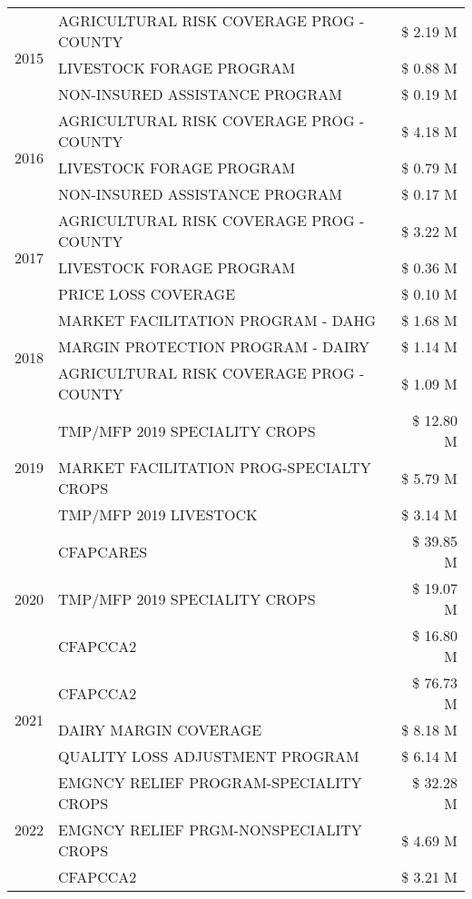 \begin{tabular}{llr}
\cline{1-3}
\multirow[t]{3}{*}{2015} & AGRICULTURAL RISK COVERAGE PROG - COUNTY & \$ 2.19 M \\
 & LIVESTOCK FORAGE PROGRAM & \$ 0.88 M \\
 & NON-INSURED ASSISTANCE PROGRAM & \$ 0.19 M \\
\cline{1-3}
\multirow[t]{3}{*}{2016} & AGRICULTURAL RISK COVERAGE PROG - COUNTY & \$ 4.18 M \\
 & LIVESTOCK FORAGE PROGRAM & \$ 0.79 M \\
 & NON-INSURED ASSISTANCE PROGRAM & \$ 0.17 M \\
\cline{1-3}
\multirow[t]{3}{*}{2017} & AGRICULTURAL RISK COVERAGE PROG - COUNTY & \$ 3.22 M \\
 & LIVESTOCK FORAGE PROGRAM & \$ 0.36 M \\
 & PRICE LOSS COVERAGE & \$ 0.10 M \\
\cline{1-3}
\multirow[t]{3}{*}{2018} & MARKET FACILITATION PROGRAM - DAHG & \$ 1.68 M \\
 & MARGIN PROTECTION PROGRAM - DAIRY & \$ 1.14 M \\
 & AGRICULTURAL RISK COVERAGE PROG - COUNTY & \$ 1.09 M \\
\cline{1-3}
\multirow[t]{3}{*}{2019} & TMP/MFP 2019 SPECIALITY CROPS & \$ 12.80 M \\
 & MARKET FACILITATION PROG-SPECIALTY CROPS & \$ 5.79 M \\
 & TMP/MFP 2019 LIVESTOCK & \$ 3.14 M \\
\cline{1-3}
\multirow[t]{3}{*}{2020} & CFAPCARES & \$ 39.85 M \\
 & TMP/MFP 2019 SPECIALITY CROPS & \$ 19.07 M \\
 & CFAPCCA2 & \$ 16.80 M \\
\cline{1-3}
\multirow[t]{3}{*}{2021} & CFAPCCA2 & \$ 76.73 M \\
 & DAIRY MARGIN COVERAGE & \$ 8.18 M \\
 & QUALITY LOSS ADJUSTMENT PROGRAM & \$ 6.14 M \\
\cline{1-3}
\multirow[t]{3}{*}{2022} & EMGNCY RELIEF PROGRAM-SPECIALITY CROPS & \$ 32.28 M \\
 & EMGNCY RELIEF PRGM-NONSPECIALITY CROPS & \$ 4.69 M \\
 & CFAPCCA2 & \$ 3.21 M \\
\cline{1-3}
\bottomrule
\end{tabular}
